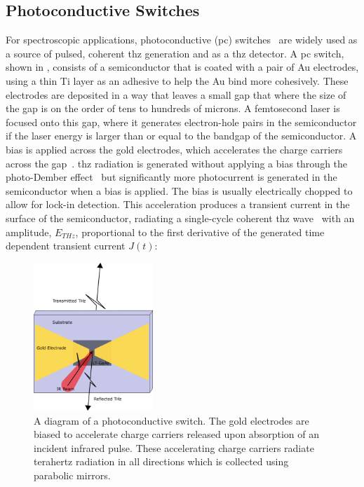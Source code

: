 \subsection{Photoconductive Switches}
\label{subsec:pcswitches}
For spectroscopic applications, photoconductive (\acrshort{pc}) switches~\cite{Warren1991} are widely used as a source of pulsed, coherent \acrshort{thz} generation and as a \acrshort{thz} detector. A \acrshort{pc} switch, shown in , consists of a semiconductor that is coated with a pair of Au electrodes, using a thin Ti layer as an adhesive to help the Au bind more cohesively. These electrodes are deposited in a way that leaves a small gap that where the size of the gap is on the order of tens to hundreds of microns. A femtosecond laser is focused onto this gap, where it generates electron\nobreakdash-hole pairs in the semiconductor if the laser energy is larger than or equal to the bandgap of the semiconductor. A bias is applied across the gold electrodes, which accelerates the charge carriers across the gap~\cite{Auston1984}. \acrshort{thz} radiation is generated without applying a bias through the photo\nobreakdash-Dember effect~\cite{Vaisakh2014} but significantly more photocurrent is generated in the semiconductor when a bias is applied. The bias is usually electrically chopped to allow for lock\nobreakdash-in detection. This acceleration produces a transient current in the surface of the semiconductor, radiating a single\nobreakdash-cycle coherent \acrshort{thz} wave~\cite{Burford2017} with an amplitude, \(E_{THz}\), proportional to the first derivative of the generated time dependent transient current \(J(t)\):

\begin{figure}
    \centering
    \includegraphics[width=0.4\textwidth]{Figures/Misc/Theory/PCA.png}
    \captionsetup{font = footnotesize, justification = centering}
    \caption[A Diagram of a Photoconductive Switch]{A diagram of a photoconductive switch. The gold electrodes are biased to accelerate charge carriers released upon absorption of an incident infrared pulse. These accelerating charge carriers radiate terahertz radiation in all directions which is collected using parabolic mirrors.}
    \label{fig:PCA}
\end{figure}

